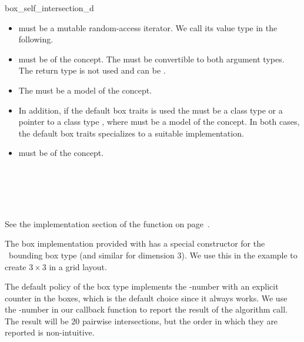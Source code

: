 \begin{ccRefFunction}{box_self_intersection_d}
\begin{itemize}
  \item
     must be a mutable random-access
    iterator. We call its value type  in the following.
  \item
     must be of the  concept. 
    The  must be convertible to both argument types. The
    return type is not used and can be .
  \item
    The  must be a model of the  concept.
  \item
    In addition, if the default box traits is used the  must
    be a class type  or a pointer to a class type , where
     must be a model of the  concept.
    In both cases, the default box traits specializes to a suitable
    implementation.
  \item
     must be of the  concept.
\end{itemize}

\ccSeeAlso

\\

\\
\\

\ccImplementation

See the implementation section of the 
function on page~\pageref{ccRef_CGAL::box_intersection_d}.

\ccExample

The box implementation provided with
 has a special
constructor for the \cgal\ bounding box type  (and
similar for dimension 3). We use this in the example to create $3
\times 3$  in a grid layout.

The default policy of the box type implements the -number with
an explicit counter in the boxes, which is the default choice since it
always works. We use the -number in our callback function to
report the result of the  algorithm call. The result will
be 20 pairwise intersections, but the order in which they are reported
is non-intuitive.


\end{ccRefFunction}


